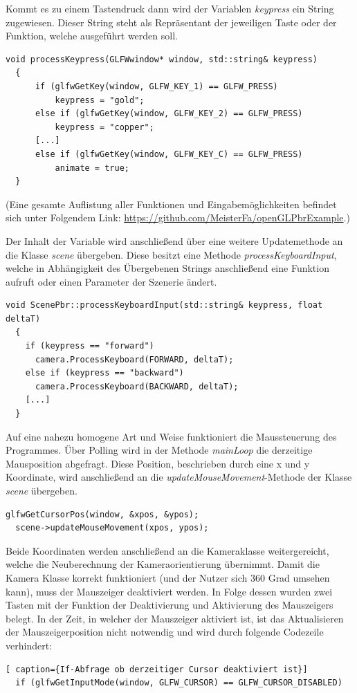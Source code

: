 \documentclass[
  11pt,
  a4paper,
  oneside
  ]{article}
\begin{document}
Kommt es zu einem Tastendruck dann wird der Variablen \textit{keypress} ein String zugewiesen. Dieser String steht als Repräsentant der jeweiligen Taste oder der Funktion, welche ausgeführt werden soll. 
\begin{lstlisting}[tabsize=2, caption={Methode processKeypress der Scenerunner-Klasse zur Zuweisung von Strings}]
  void processKeypress(GLFWwindow* window, std::string& keypress)
  {
      if (glfwGetKey(window, GLFW_KEY_1) == GLFW_PRESS)
          keypress = "gold";
      else if (glfwGetKey(window, GLFW_KEY_2) == GLFW_PRESS)
          keypress = "copper";
      [...]
      else if (glfwGetKey(window, GLFW_KEY_C) == GLFW_PRESS)
          animate = true;
  }
\end{lstlisting}
(Eine gesamte Auflistung aller Funktionen und Eingabemöglichkeiten befindet sich unter Folgendem Link: \url{https://github.com/MeisterFa/openGLPbrExample}.) 

Der Inhalt der Variable wird anschließend über eine weitere Updatemethode an die Klasse \textit{scene} übergeben. Diese besitzt eine Methode \textit{processKeyboardInput}, welche in Abhängigkeit des Übergebenen Strings anschließend eine Funktion aufruft oder einen Parameter der Szenerie ändert. 
\begin{lstlisting}[tabsize=2, caption={Ausschnitt der processKeyboardInput-Methode der Klasse ScenePbr}]
  void ScenePbr::processKeyboardInput(std::string& keypress, float deltaT)
  {
    if (keypress == "forward")
      camera.ProcessKeyboard(FORWARD, deltaT);
    else if (keypress == "backward")
      camera.ProcessKeyboard(BACKWARD, deltaT);
    [...]
  }
\end{lstlisting}

Auf eine nahezu homogene Art und Weise funktioniert die Maussteuerung des Programmes. Über Polling wird in der Methode \textit{mainLoop} die derzeitige Mausposition abgefragt. Diese Position, beschrieben durch eine x und y Koordinate, wird anschließend an die \textit{updateMouseMovement}-Methode der Klasse \textit{scene} übergeben. 
\begin{lstlisting}[caption={Funktionsaufrufe zum empfangen und setzen der Mausposition}]
  glfwGetCursorPos(window, &xpos, &ypos);
  scene->updateMouseMovement(xpos, ypos);
\end{lstlisting}

Beide Koordinaten werden anschließend an die Kameraklasse weitergereicht, welche die Neuberechnung der Kameraorientierung übernimmt. Damit die Kamera Klasse korrekt funktioniert (und der Nutzer sich 360 Grad umsehen kann), muss der Mauszeiger deaktiviert werden. In Folge dessen wurden zwei Tasten mit der Funktion der Deaktivierung und Aktivierung des Mauszeigers belegt. In der Zeit, in welcher der Mauszeiger aktiviert ist, ist das Aktualisieren der Mauszeigerposition nicht notwendig und wird durch folgende Codezeile verhindert: 
\begin{lstlisting}[ caption={If-Abfrage ob derzeitiger Cursor deaktiviert ist}]
  if (glfwGetInputMode(window, GLFW_CURSOR) == GLFW_CURSOR_DISABLED)
\end{lstlisting}
\end{document}

